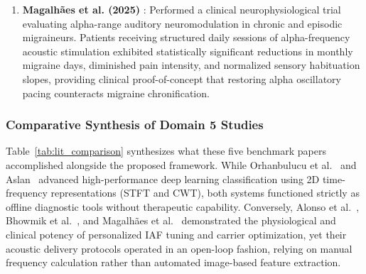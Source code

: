\documentclass[12pt, a4paper]{report}
\begin{document}
\begin{enumerate}
    \item \textbf{Magalh\~aes et al. (2025)} \cite{magalhaes2025auditory}: Performed a clinical neurophysiological trial evaluating alpha-range auditory neuromodulation in chronic and episodic migraineurs. Patients receiving structured daily sessions of alpha-frequency acoustic stimulation exhibited statistically significant reductions in monthly migraine days, diminished pain intensity, and normalized sensory habituation slopes, providing clinical proof-of-concept that restoring alpha oscillatory pacing counteracts migraine chronification.
\end{enumerate}

\subsubsection{Comparative Synthesis of Domain 5 Studies}
Table~\ref{tab:lit_comparison} synthesizes what these five benchmark papers accomplished alongside the proposed framework. While Orhanbulucu et al.~\cite{orhanbulucu2023hybrid} and Aslan~\cite{aslan2023migrainecnn} advanced high-performance deep learning classification using 2D time-frequency representations (STFT and CWT), both systems functioned strictly as offline diagnostic tools without therapeutic capability. Conversely, Alonso et al.~\cite{alonso2024individualized}, Bhowmik et al.~\cite{bhowmik2024carrier}, and Magalh\~aes et al.~\cite{magalhaes2025auditory} demonstrated the physiological and clinical potency of personalized IAF tuning and carrier optimization, yet their acoustic delivery protocols operated in an open-loop fashion, relying on manual frequency calculation rather than automated image-based feature extraction.
\end{document}
